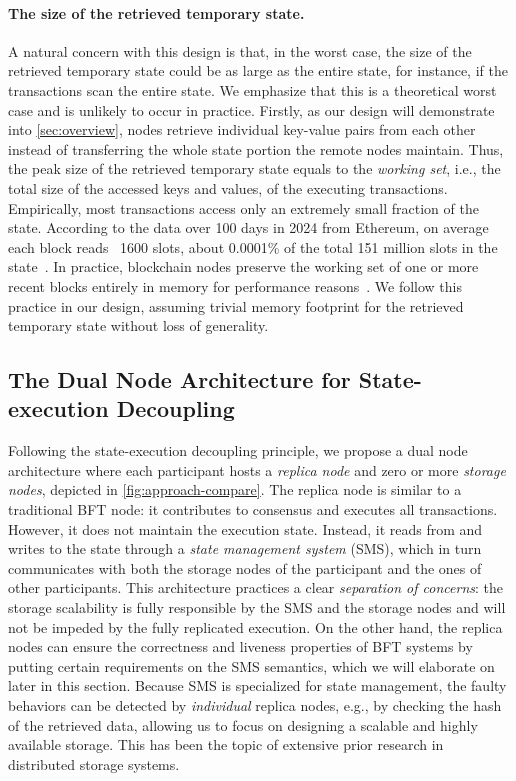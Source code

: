 \paragraph{The size of the retrieved temporary state.}
A natural concern with this design is that, in the worst case, the size of the retrieved temporary state could be as large as the entire state, for instance, if the transactions scan the entire state.
We emphasize that this is a theoretical worst case and is unlikely to occur in practice.
Firstly, as our design will demonstrate into \cref{sec:overview}, nodes retrieve individual key-value pairs from each other instead of transferring the whole state portion the remote nodes maintain.
Thus, the peak size of the retrieved temporary state equals to the \emph{working set}, i.e., the total size of the accessed keys and values, of the executing transactions.
Empirically, most transactions access only an extremely small fraction of the state.
According to the data over 100 days in 2024 from Ethereum, on average each block reads ~1600 slots, about 0.0001\% of the total 151 million slots in the state~\cite{ProperDiskIO_GasPricing_LRUcache_2024}.
In practice, blockchain nodes preserve the working set of one or more recent blocks entirely in memory for performance reasons~\cite{nodereal2022_bsc_cache_hit_rate}.
We follow this practice in our design, assuming trivial memory footprint for the retrieved temporary state without loss of generality.
 

\subsection{The Dual Node Architecture for State-execution Decoupling}

Following the state-execution decoupling principle, we propose a dual node architecture where each participant hosts a \emph{replica node} and zero or more \emph{storage nodes}, depicted in \cref{fig:approach-compare}.
The replica node is similar to a traditional BFT node: it contributes to consensus and executes all transactions.
However, it does not maintain the execution state.
Instead, it reads from and writes to the state through a \emph{state management system} (SMS), which in turn communicates with both the storage nodes of the participant and the ones of other participants.
This architecture practices a clear \emph{separation of concerns}: the storage scalability is fully responsible by the SMS and the storage nodes and will not be impeded by the fully replicated execution.
On the other hand, the replica nodes can ensure the correctness and liveness properties of BFT systems by putting certain requirements on the SMS semantics, which we will elaborate on later in this section.
Because SMS is specialized for state management, the faulty behaviors can be detected by \emph{individual} replica nodes, e.g., by checking the hash of the retrieved data, allowing us to focus on designing a scalable and highly available storage.
This has been the topic of extensive prior research in distributed storage systems.

